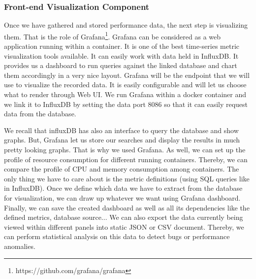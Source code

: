 \subsubsection{Front-end Visualization Component}
Once we have gathered and stored performance data, the next step is visualizing them. That is the role of Grafana\footnote{https://github.com/grafana/grafana}. Grafana can be considered as a web application running within a container. It is one of the best time-series metric visualization tools available. It can easily work with data held in InfluxDB. It provides us a dashboard to run queries against the linked database and chart them accordingly in a very nice layout. Grafana will be the endpoint that we will use to visualize the recorded data. It is easily configurable and will let us choose what to render through Web UI. We run Grafana within a docker container and we link it to InfluxDB by setting the data port 8086 so that it can easily request data from the database.

We recall that influxDB has also an interface to query the database and show graphs. But, Grafana let us store our searches and display the results in much pretty looking graphs. That is why we used Grafana.
As well, we can set up the profile of resource consumption for different running
containers. Thereby, we can compare the profile of CPU and memory consumption among containers. The only thing we have to care about is the metric definitions (using SQL queries like in InfluxDB). Once we define which data we have to extract from the database for visualization, we can draw up whatever we want using Grafana dashboard. Finally, we can save the created dashboard as well as all its dependencies like the defined metrics, database source... We can also export the data currently being viewed within different
panels into static JSON or CSV document. Thereby, we can perform statistical analysis on this data to detect bugs or performance anomalies.

